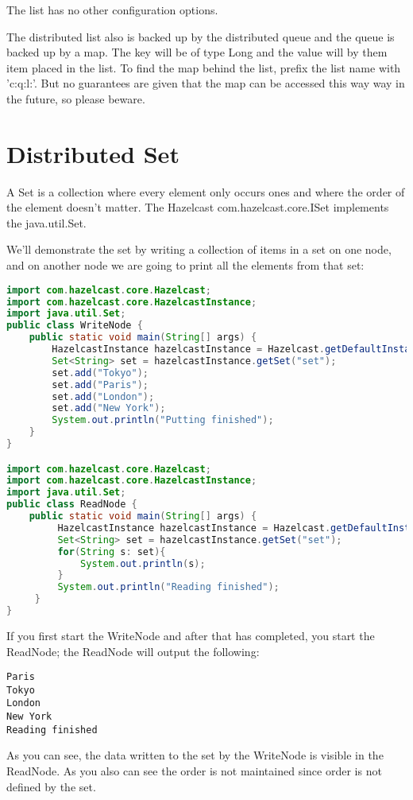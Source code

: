 The list has no other configuration options.

The distributed list also is backed up by the distributed queue and the queue is backed up by a map. The key will be of type Long and the value will by them item placed in the list. To find the map behind the list, prefix the list name with 'c:q:l:'. But no guarantees are given that the map can be accessed this way way in the future, so please beware. 

\section{Distributed Set}

A Set is a collection where every element only occurs ones and where the order of the element doesn't matter. The Hazelcast com.hazelcast.core.ISet implements the java.util.Set.

We'll demonstrate the set by writing a collection of items in a set on one node, and on another node we are going to print all the elements from that set:

\begin{lstlisting}[language=java]
import com.hazelcast.core.Hazelcast;
import com.hazelcast.core.HazelcastInstance;
import java.util.Set;
public class WriteNode {
    public static void main(String[] args) {
        HazelcastInstance hazelcastInstance = Hazelcast.getDefaultInstance();
        Set<String> set = hazelcastInstance.getSet("set");
        set.add("Tokyo");
        set.add("Paris");
        set.add("London");
        set.add("New York");
        System.out.println("Putting finished");
    }
}

import com.hazelcast.core.Hazelcast;
import com.hazelcast.core.HazelcastInstance;
import java.util.Set;
public class ReadNode {
    public static void main(String[] args) {
         HazelcastInstance hazelcastInstance = Hazelcast.getDefaultInstance();
         Set<String> set = hazelcastInstance.getSet("set");
         for(String s: set){
             System.out.println(s);
         }
         System.out.println("Reading finished");
     }
}

\end{lstlisting}

If you first start the WriteNode and after that has completed, you start the ReadNode; the ReadNode will output the following:
\begin{verbatim}
Paris
Tokyo
London
New York
Reading finished	
\end{verbatim}
As you can see, the data written to the set by the WriteNode is visible in the ReadNode. As you also can see the order is not maintained since order is not defined by the set.

